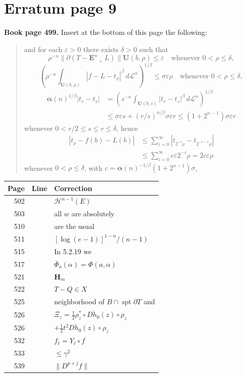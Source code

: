 \documentclass[11pt]{article}
\makeatletter
\newcommand{\Leb}{\mathscr L}
\newcommand{\Haus}{\mathscr H}
\newcommand{\restrict}{\mathbin{\llcorner}}
\newcommand{\spt}{\operatorname{spt}}
\newcommand{\U}{\mathbf U}
\newcommand{\E}{\mathbf E}
\newcommand{\entry}[3]{#1&#2&#3\\[4pt]}
\newenvironment{corrections}{%
  \begin{longtable}{@{}r >{\raggedright\arraybackslash}p{21mm} >{\raggedright\arraybackslash}p{118mm}@{}}
  \textbf{Page}&\textbf{Line}&\textbf{Correction}\\\hline\endhead
}{\end{longtable}}
\makeatother
\begin{document}
\section*{Erratum page 9}
\noindent\textbf{Book page 499.} Insert at the bottom of this page the following:
\begin{quote}
and for each $\varepsilon>0$ there exists $\delta>0$ such that
\[
\rho^{-n}\|\partial(T-\E^n\restrict L)\|\U(b,\rho)\le\varepsilon
\quad\text{whenever }0<\rho\le\delta,
\]
\[
\left(\rho^{-n}\int_{\U(b,\rho)}|f-L-t_\rho|^\beta\,d\Leb^n\right)^{1/\beta}
\le\sigma\varepsilon\rho\quad\text{whenever }0<\rho\le\delta,
\]
\begin{align*}
\bm\alpha(n)^{1/\beta}|t_r-t_s|
&=\left(s^{-n}\int_{\U(b,s)}|t_r-t_s|^\beta\,d\Leb^n\right)^{1/\beta}\\
&\le\sigma\varepsilon s+(r/s)^{n/\beta}\sigma\varepsilon r
\le(1+2^{n-1})\sigma\varepsilon r
\end{align*}
whenever $0<r/2\le s\le r\le\delta$, hence
\begin{align*}
|t_\rho-f(b)-L(b)|
&\le\sum_{i=0}^{\infty}|t_{2^{-i}\rho}-t_{2^{-i-1}\rho}|\\
&\le\sum_{i=0}^{\infty}c\varepsilon2^{-i}\rho=2c\varepsilon\rho
\end{align*}
whenever $0<\rho\le\delta$, with $c=\bm\alpha(n)^{-1/\beta}(1+2^{n-1})\sigma$,
\end{quote}
\begin{corrections}
\entry{502}{3}{$\Haus^{n-1}(E)$}
\entry{503}{12}{all $w$ are absolutely}
\entry{510}{14}{are the usual}
\entry{511}{24}{$[\log(e-1)]^{1-n}/(n-1)$}
\entry{515}{23}{In 5.2.19 we}
\entry{517}{10}{$\overline\Phi_a(\alpha)=\Phi(a,\alpha)$}
\entry{521}{33}{$\mathbf H_m$}
\entry{522}{27}{$T-Q\in X$}
\entry{525}{23}{neighborhood of $B\cap\spt\partial T$ and}
\entry{526}{17}{$\Xi_z=\tfrac12\rho_z^*\circ D\ddot h_0(z)\circ\rho_z$}
\entry{526}{20}{$+\tfrac12t^2D\ddot h_0(z)\circ\rho_z$}
\entry{532}{7}{$f_\ell=Y_\ell\circ f$}
\entry{533}{15}{$\le\gamma^2$}
\entry{539}{20}{$\|D^{p+j}f\|$}
\end{corrections}
\end{document}
